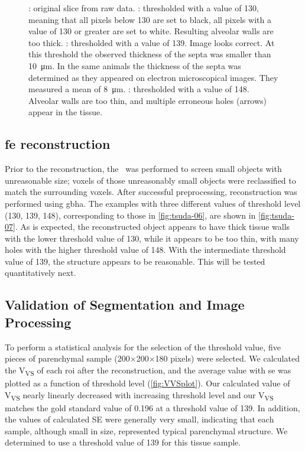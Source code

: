\begin{figure}[htb]
{{{				\label{subfig:tsuda-06d}%
			}%
		}%
	}%
	\caption[Thresholding Influence]{: original slice from raw data. : thresholded with a value of 130, meaning that all pixels below 130 are set to black, all pixels with a value of 130 or greater are set to white. Resulting alveolar walls are too thick. : thresholded with a value of 139. Image looks correct. At this threshold the observed thickness of the septa was smaller than \SI{10}{\micro\meter}. In the same animals \cite{Roth2005} the thickness of the septa was determined as they appeared on electron microscopical images. They measured a mean of \SI{8}{\micro\meter}. : thresholded with a value of 148. Alveolar walls are too thin, and multiple erroneous holes (arrows) appear in the tissue.}
	\label{fig:tsuda-06}
\end{figure}%

\subsection{\acs{fe} \threed reconstruction}
Prior to the \threed reconstruction, the \ was performed to screen small objects with unreasonable size; voxels of those unreasonably small objects were reclassified to match the surrounding voxels. After successful preprocessing, \threed reconstruction was performed using \ac{gbha}. The examples with three different values of threshold level (130, 139, 148), corresponding to those in \autoref{fig:tsuda-06}, are shown in \autoref{fig:tsuda-07}. As is expected, the \threed reconstructed object appears to have thick tissue walls with the lower threshold value of 130, while it appears to be too thin, with many holes with the higher threshold value of 148. With the intermediate threshold value of 139, the structure appears to be reasonable. This will be tested quantitatively next.

\subsection[Validation of Segmentation \& Image Processing]{Validation of Segmentation and Image Processing}
To perform a statistical analysis for the selection of the threshold value, five pieces of parenchymal sample (200$\times$200$\times$180 pixels) were selected. We calculated the V\textsubscript{VS} of each \ac{roi} after the \threed reconstruction, and the average value with \ac{se} was plotted as a function of threshold level (\autoref{fig:VVSplot}). Our calculated value of V\textsubscript{VS} nearly linearly decreased with increasing threshold level and our V\textsubscript{VS} matches the gold standard value of 0.196 at a threshold value of 139. In addition, the values of calculated SE were generally very small, indicating that each sample, although small in size, represented typical parenchymal structure. We determined to use a threshold value of 139 for this tissue sample.

